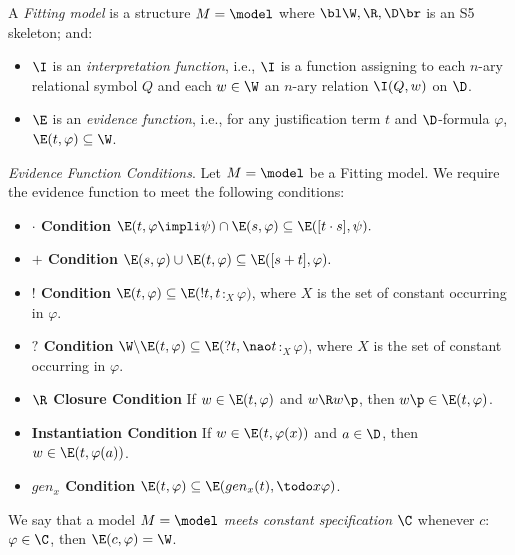 \begin{defn}
A \textit{Fitting model} is a structure $M = \model$ where $\bl \W, \R, \D \br$ is an S5 skeleton; and:

\begin{itemize} 
\item $\I$ is an \textit{interpretation function}, i.e.,  $\I$ is a function assigning to each $n$-ary relational symbol $Q$ and each $w \in \W$ an $n$-ary relation $\I(Q,w)$ on $\D$.

\item $\E$ is an \textit{evidence function}, i.e., for any justification term $t$ and $\D$-formula $\varphi$, $\E(t,\varphi) \subseteq \W$.
\end{itemize}

\end{defn}



\begin{defn}
\textit{Evidence Function Conditions}. Let $M = \model$ be a Fitting model. We require the evidence function to meet the following conditions:


\begin{itemize} 
	\item[] \textbf{$\cdot$ Condition} $\E (t, \varphi \impli \psi) \cap \E(s, \varphi) \subseteq \E([t\cdot s], \psi).$
	\item[] \textbf{$+$ Condition} $\E (s, \varphi) \cup \E(t, \varphi) \subseteq \E([s+t], \varphi).$
	\item[] \textbf{$!$ Condition} $\E (t, \varphi) \subseteq \E(!t, t$$:_{X}\varphi)$, where $X$ is the set of constant occurring in $\varphi$.
    \item[] \textbf{$?$ Condition} $\W  \backslash \E (t, \varphi) \subseteq \E(?t,\nao t$$:_{X}\varphi)$, where $X$ is the set of constant occurring in $\varphi$.
	\item[] \textbf{$\R$ Closure Condition} If $w \in \E (t, \varphi)$ and $w \R w\p$, then $w\p \in \E (t, \varphi)$.
	\item[] \textbf{Instantiation Condition} If $w \in \E (t, \varphi(x))$ and $a \in \D$, then $w \in \E (t, \varphi(a))$.
	\item[] \textbf{$gen_{x}$ Condition} $\E (t, \varphi) \subseteq \E(gen_{x}(t),\todo x\varphi)$.
\end{itemize}
\end{defn}

\qquad We say that a model $M = \model$ \textit{meets constant specification $\C$} whenever $c$$:$$\varphi \in \C$, then $\E (c, \varphi) = \W$.


